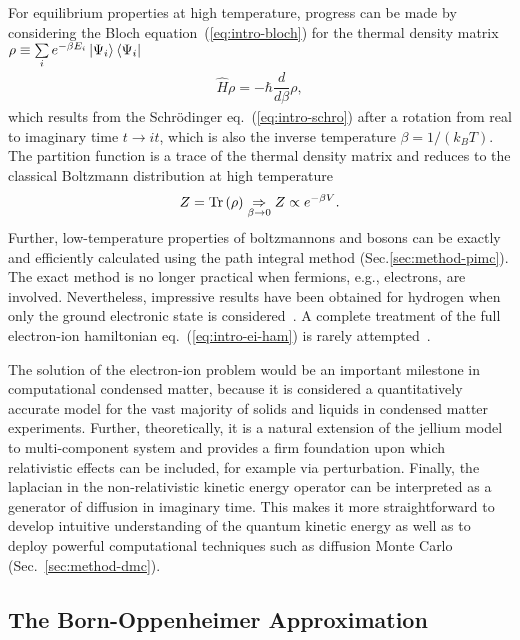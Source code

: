 For equilibrium properties at high temperature, progress can be made by considering the Bloch equation~(\ref{eq:intro-bloch}) for the thermal density matrix $\rho\equiv\sum\limits_i e^{-\beta E_i} \ket{\Psi_i}\bra{\Psi_i}$
\begin{align} \label{eq:intro-bloch}
\hat{H} \rho = -\hbar\dfrac{d}{d\beta}\rho,
\end{align}
which results from the Schr\"odinger eq.~(\ref{eq:intro-schro}) after a rotation from real to imaginary time $t\rightarrow it$, which is also the inverse temperature $\beta=1/(k_BT)$.
The partition function is a trace of the thermal density matrix and reduces to the classical Boltzmann distribution at high temperature
\begin{align}
Z=\text{Tr}\left(\rho\right) \underset{\beta\rightarrow 0}{\Rightarrow} Z \propto e^{-\beta V}.
\end{align}
Further, low-temperature properties of boltzmannons and bosons can be exactly and efficiently calculated using the path integral method (Sec.\ref{sec:method-pimc}). The exact method is no longer practical when fermions, e.g., electrons, are involved. Nevertheless, impressive results have been obtained for hydrogen when only the ground electronic state is considered~\cite{Pierleoni2016b,Celliers2018}.
A complete treatment of the full electron-ion hamiltonian eq.~(\ref{eq:intro-ei-ham}) is rarely attempted~\cite{Ceperley1981,Natoli1995}.

The solution of the electron-ion problem would be an important milestone in computational condensed matter, because it is considered a quantitatively accurate model for the vast majority of solids and liquids in condensed matter experiments. Further, theoretically, it is a natural extension of the jellium model to multi-component system and provides a firm foundation upon which relativistic effects can be included, for example via perturbation. Finally, the laplacian in the non-relativistic kinetic energy operator can be interpreted as a generator of diffusion in imaginary time. This makes it more straightforward to develop intuitive understanding of the quantum kinetic energy as well as to deploy powerful computational techniques such as diffusion Monte Carlo (Sec.~\ref{sec:method-dmc}).

\subsection{The Born-Oppenheimer Approximation}

